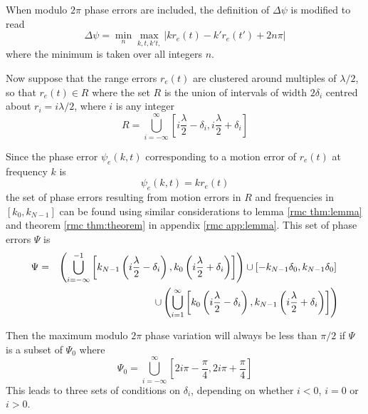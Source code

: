 When modulo $2\pi$ phase errors are included, the definition of $\Delta\psi$
is modified to read
\begin{equation}
\Delta\psi=\min_n\max_{k,t,k't,}\left|kr_e(t)-k'r_e(t')+2n\pi\right|
\end{equation}
where the minimum is taken over all integers $n$.

Now suppose that the range errors $r_e(t)$ are clustered around multiples of
$\lambda/2$, so that $r_e(t)\in R$ where the set $R$ is the union of
intervals of width $2\delta_i$ centred about $r_i=i\lambda/2$, where $i$ is
any integer
\begin{equation}
R=\bigcup_{i=-\infty}^{\infty} 
\left[i\frac{\lambda}{2}-\delta_i, i\frac{\lambda}{2}+\delta_i\right]
\end{equation}

Since the phase error $\psi_e(k,t)$ corresponding to a motion error of 
$r_e(t)$ at frequency $k$ is
\begin{equation}
\psi_e(k,t)=kr_e(t)
\end{equation}
the set of phase errors resulting from motion errors in $R$ and frequencies
in $[k_0,k_{N-1}]$ can be found using similar considerations to lemma
\ref{rmc thm:lemma} and theorem \ref{rmc thm:theorem} in appendix 
\ref{rmc app:lemma}.  This set of phase errors $\Psi$ is
\begin{eqnarray}
\Psi&=&\left(
  \bigcup_{i=-\infty}^{-1}\left[
    k_{N-1}\left(i\frac{\lambda}{2}-\delta_i\right), 
    k_0\left(i\frac{\lambda}{2}+\delta_i\right)
  \right]
\right)\cup\left[-k_{N-1}\delta_0,k_{N-1}\delta_0\right]{\nonumber}\\
&&\qquad\cup\left(
  \bigcup_{i=1}^{\infty}\left[
    k_0\left(i\frac{\lambda}{2}-\delta_i\right), 
    k_{N-1}\left(i\frac{\lambda}{2}+\delta_i\right)
  \right]
\right)
\end{eqnarray}

Then the maximum modulo $2\pi$ phase variation will always be less than
$\pi/2$ if $\Psi$ is a subset of $\Psi_0$ where
\begin{equation}
\Psi_0=\bigcup_{i=-\infty}^{\infty} 
\left[2i\pi-\frac{\pi}{4}, 2i\pi+\frac{\pi}{4}\right]
\end{equation}
This leads to three sets of conditions on $\delta_i$, depending on whether
$i<0$, $i=0$ or $i>0$.


